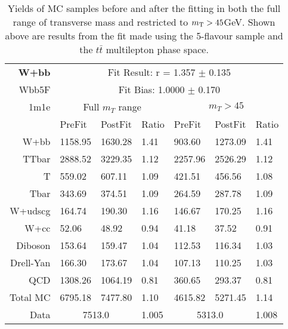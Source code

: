 \begin{table}[htb]
\begin{center}
\begin{tabular}{r|l|l|l|l|l|l}
\bf{W+bb} & \multicolumn{6}{c}{Fit Result: r = 1.357 $\pm$ 0.135}\\ 
Wbb5F & \multicolumn{6}{c}{Fit Bias: 1.0000 $\pm$ 0.170}\\ 
1m1e & \multicolumn{3}{c}{Full $m_T$ range} & \multicolumn{3}{c}{$m_T>45$}\\ 
{} & PreFit & PostFit & Ratio & PreFit & PostFit & Ratio \\ \hline 
W+bb  &	 1158.95 &	 1630.28 &	 1.41 &	 903.60 &	 1273.09 &	 1.41\\ 
TTbar  &	 2888.52 &	 3229.35 &	 1.12 &	 2257.96 &	 2526.29 &	 1.12\\ 
T  &	 559.02 &	 607.11 &	 1.09 &	 421.51 &	 456.56 &	 1.08\\ 
Tbar  &	 343.69 &	 374.51 &	 1.09 &	 264.59 &	 287.78 &	 1.09\\ 
W+udscg  &	 164.74 &	 190.30 &	 1.16 &	 146.67 &	 170.25 &	 1.16\\ 
W+cc  &	 52.06 &	 48.92 &	 0.94 &	 41.18 &	 37.52 &	 0.91\\ 
Diboson  &	 153.64 &	 159.47 &	 1.04 &	 112.53 &	 116.34 &	 1.03\\ 
Drell-Yan  &	 166.30 &	 173.67 &	 1.04 &	 107.13 &	 110.25 &	 1.03\\ 
QCD  &	 1308.26 &	 1064.19 &	 0.81 &	 360.65 &	 293.37 &	 0.81\\ 
Total MC  &	 6795.18 &	 7477.80 &	 1.10 &	 4615.82 &	 5271.45 &	 1.14\\ 
\hline \hline 
Data & \multicolumn{2}{c|}{7513.0} & 1.005 & \multicolumn{2}{c|}{5313.0} & 1.008 
\end{tabular}
\caption{
 Yields of MC samples before and after the fitting
  in both the full range of transverse mass and restricted 
  to $m_\mathrm{T}>45$GeV.
 Shown above are results from the fit made using the 5-flavour \Wbb sample and the
  $t\bar{t}$ multilepton phase space.}
\label{tab:fitYields_5F_1m1e}
\end{center}
\end{table}

